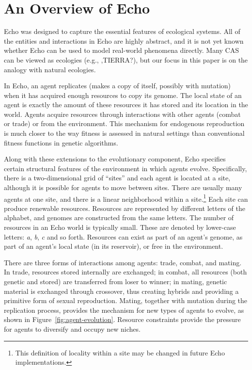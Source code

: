 \section{An Overview of Echo}
\label{echo-overview}

Echo was designed to capture the essential features of ecological
systems.  All of the entities and interactions in Echo are highly
abstract, and it is not yet known whether Echo can be used to model
real-world phenomena directly.  Many CAS can be viewed as ecologies
(e.g., \cite{Huberman91},TIERRA?), but our focus in this paper is on
the analogy with natural ecologies.  

In Echo, an agent replicates (makes a copy of itself, possibly with
mutation) when it has acquired enough resources to copy its
genome.  The local state of an agent is exactly the amount of these
resources it has stored and its location in the world.  Agents acquire
resources through interactions with other agents (combat or trade) or
from the environment.  This mechanism for endogenous reproduction
is much closer to the way fitness is assessed in natural settings than
conventional fitness functions in genetic algorithms.

Along with these extensions to the evolutionary component, Echo
specifies certain structural features of the environment in which
agents evolve.  Specifically, there is a two-dimensional grid of
``sites'' and each agent is located at a site, although it is possible
for agents to move between sites.  There are usually many agents at
one site, and there is a linear neighborhood within a
site.\footnote{This definition of locality within a site may be
changed in future Echo implementations.}  Each site can produce
renewable resources.  Resources are represented by different letters
of the alphabet, and genomes are constructed from the same letters.
The number of resources in an Echo world is typically small. These are
denoted by lower-case letters: {\em a}, {\em b}, {\em c\/} and so
forth.  Resources can exist as part of an agent's genome, as part of
an agent's local state (in its reservoir), or free in the environment.

There are three forms of interactions among agents: trade, combat, and
mating.  In trade, resources stored internally are exchanged; in
combat, all resources (both genetic and stored) are transferred from
loser to winner; in mating, genetic material is exchanged through
crossover, thus creating hybrids and providing a primitive form of
sexual reproduction.  Mating, together with mutation during the
replication process, provides the mechanism for new types of agents to
evolve, as shown in Figure~\ref{fig:agent-evolution}.  Resource
constraints provide the pressure for agents to diversify and occupy
new niches.

